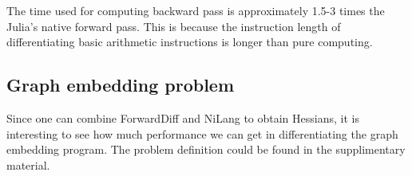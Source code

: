 \documentclass{article}
\newcommand{\<}{\langle}
\renewcommand{\>}{\rangle}
\newcommand{\ra}[1]{\renewcommand{\arraystretch}{#1}}
\theoremstyle{definition}\newtheorem{definition}{\textit{Definition}}
\begin{document}
The time used for computing backward pass is approximately 1.5-3 times the Julia's native forward pass.
This is because the instruction length of differentiating basic arithmetic instructions is longer than pure computing.


\subsection{Graph embedding problem}\label{sec:graphbench}
Since one can combine ForwardDiff and NiLang to obtain Hessians,
it is interesting to see how much performance we can get in differentiating the graph embedding program. The problem definition could be found in the supplimentary material.

\begin{table}[h!]\centering
    \small
\begin{minipage}{\columnwidth}
\ra{1.3}
    \caption{Absolute times in seconds for computing the objectives (O), uncall objective (U), gradients (G) and Hessians (H) of the graph embedding program.
    $k$ is the embedding dimension, the number of parameters is $10k$.
    }\label{tbl:graphembedding}
\end{minipage}
\end{table}
\end{document}
